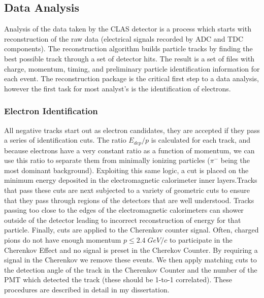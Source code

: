 
\subsection{Data Analysis}
Analysis of the data taken by the CLAS detector is a process which starts with reconstruction of the raw data (electrical signals recorded by ADC and TDC components).  The reconstruction algorithm builds particle tracks by finding the best possible track through a set of detector hits.  The result is a set of files with charge, momentum, timing, and preliminary particle identification information for each event.  The reconstruction package is the critical first step to a data analysis, however the first task for most analyst's is the identification of electrons.

\subsubsection{Electron Identification}
All negative tracks start out as electron candidates, they are accepted if they pass a series of identification cuts. The ratio $E_{dep}/p$ is calculated for each track, and because electrons have a very constant ratio as a function of momentum, we can use this ratio to separate them from minimally ionizing particles ($\pi^{-}$ being the most dominant background).  Exploiting this same logic, a cut is placed on the minimum energy deposited in the electromagnetic calorimeter inner layers.Tracks that pass these cuts are next subjected to a variety of geometric cuts to ensure that they pass through regions of the detectors that are well understood.  Tracks passing too close to the edges of the electromagnetic calorimeters can shower outside of the detector leading to incorrect reconstruction of energy for that particle.  Finally, cuts are applied to the Cherenkov counter signal.  Often, charged pions do not have enough momentum $p \leq 2.4 \; GeV/c$ to participate in the Cherenkov Effect and no signal is preset in the Cherekov Counter.  By requiring a signal in the Cherenkov we remove these events.  We then apply matching cuts to the detection angle of the track in the Cherenkov Counter and the number of the PMT which detected the track (these should be 1-to-1 correlated).  These procedures are described in detail in my dissertation.

